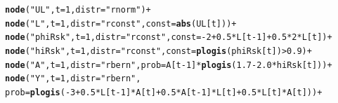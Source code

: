\documentclass{article}\usepackage[]{graphicx}\usepackage[]{color}
\makeatletter
\newcommand{\hlnum}[1]{\textcolor[rgb]{0.686,0.059,0.569}{#1}}%
\newcommand{\hlstr}[1]{\textcolor[rgb]{0.192,0.494,0.8}{#1}}%
\newcommand{\hlopt}[1]{\textcolor[rgb]{0,0,0}{#1}}%
\newcommand{\hlstd}[1]{\textcolor[rgb]{0.345,0.345,0.345}{#1}}%
\newcommand{\hlkwc}[1]{\textcolor[rgb]{0.333,0.667,0.333}{#1}}%
\newcommand{\hlkwd}[1]{\textcolor[rgb]{0.737,0.353,0.396}{\textbf{#1}}}%
\newenvironment{kframe}{%
 \def\at@end@of@kframe{}%
 \ifinner\ifhmode%
  \def\at@end@of@kframe{\end{minipage}}%
  \begin{minipage}{\columnwidth}%
 \fi\fi%
 \def\FrameCommand##1{\hskip\@totalleftmargin \hskip-\fboxsep
 \colorbox{shadecolor}{##1}\hskip-\fboxsep
     \hskip-\linewidth \hskip-\@totalleftmargin \hskip\columnwidth}%
 \MakeFramed {\advance\hsize-\width
   \@totalleftmargin\z@ \linewidth\hsize
   \@setminipage}}%
 {\par\unskip\endMakeFramed%
 \at@end@of@kframe}
\newenvironment{knitrout}{}{} %
\makeatother
\begin{document}
\begin{knitrout}
\begin{kframe}
\begin{alltt}
    \hlkwd{node}\hlstd{(}\hlstr{"UL"}\hlstd{,}\hlkwc{t} \hlstd{=} \hlnum{1}\hlstd{,} \hlkwc{distr} \hlstd{=} \hlstr{"rnorm"}\hlstd{)} \hlopt{+}
    \hlkwd{node}\hlstd{(}\hlstr{"L"}\hlstd{,} \hlkwc{t} \hlstd{=} \hlnum{1}\hlstd{,} \hlkwc{distr} \hlstd{=} \hlstr{"rconst"}\hlstd{,} \hlkwc{const} \hlstd{=} \hlkwd{abs}\hlstd{(UL[t]))} \hlopt{+}
    \hlkwd{node}\hlstd{(}\hlstr{"phiRsk"}\hlstd{,} \hlkwc{t} \hlstd{=} \hlnum{1}\hlstd{,} \hlkwc{distr} \hlstd{=} \hlstr{"rconst"}\hlstd{,} \hlkwc{const} \hlstd{=} \hlopt{-}\hlnum{2} \hlopt{+} \hlnum{0.5}\hlopt{*}\hlstd{L[t}\hlopt{-}\hlnum{1}\hlstd{]} \hlopt{+} \hlnum{0.5}\hlopt{*}\hlnum{2}\hlopt{*}\hlstd{L[t])} \hlopt{+}
    \hlkwd{node}\hlstd{(}\hlstr{"hiRsk"}\hlstd{,} \hlkwc{t} \hlstd{=} \hlnum{1}\hlstd{,} \hlkwc{distr} \hlstd{=} \hlstr{"rconst"}\hlstd{,} \hlkwc{const} \hlstd{=} \hlkwd{plogis}\hlstd{(phiRsk[t])} \hlopt{>} \hlnum{0.9}\hlstd{)} \hlopt{+}
    \hlkwd{node}\hlstd{(}\hlstr{"A"}\hlstd{,} \hlkwc{t} \hlstd{=} \hlnum{1}\hlstd{,} \hlkwc{distr} \hlstd{=} \hlstr{"rbern"}\hlstd{,} \hlkwc{prob} \hlstd{= A[t}\hlopt{-}\hlnum{1}\hlstd{]}\hlopt{*}\hlkwd{plogis}\hlstd{(}\hlnum{1.7} \hlopt{-} \hlnum{2.0}\hlopt{*}\hlstd{hiRsk[t]))} \hlopt{+}
    \hlkwd{node}\hlstd{(}\hlstr{"Y"}\hlstd{,} \hlkwc{t} \hlstd{=} \hlnum{1}\hlstd{,} \hlkwc{distr} \hlstd{=} \hlstr{"rbern"}\hlstd{,}
      \hlkwc{prob} \hlstd{=} \hlkwd{plogis}\hlstd{(}\hlopt{-}\hlnum{3} \hlopt{+} \hlnum{0.5}\hlopt{*}\hlstd{L[t}\hlopt{-}\hlnum{1}\hlstd{]}\hlopt{*}\hlstd{A[t]} \hlopt{+} \hlnum{0.5}\hlopt{*}\hlstd{A[t}\hlopt{-}\hlnum{1}\hlstd{]}\hlopt{*}\hlstd{L[t]} \hlopt{+} \hlnum{0.5}\hlopt{*}\hlstd{L[t]}\hlopt{*}\hlstd{A[t]))} \hlopt{+}


\end{alltt}
\end{kframe}
\end{knitrout}
\end{document}
